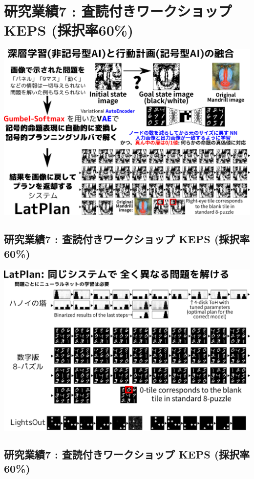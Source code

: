 \section{研究業績7 : 査読付きワークショップ KEPS (採択率60\%)}
\label{sec-9}

\begin{resume}
\end{resume}

\includegraphics{img/keps17.png}

\subsection{研究業績7 : 査読付きワークショップ KEPS (採択率60\%)}
\label{sec-9-1}

\includegraphics{img/keps17-2.png}

\subsection{研究業績7 : 査読付きワークショップ KEPS (採択率60\%)}
\label{sec-9-2}

